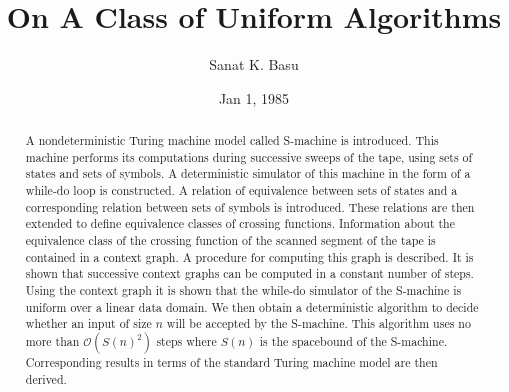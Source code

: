 \documentclass{article}
\title{On A Class of Uniform Algorithms}
\author{Sanat K. Basu}
\date{Jan 1, 1985}
\begin{document}
\newcommand\cell[1]{\mathrm{cell}\,#1}
\newcommand\cellp[1]{\mathrm{cell}'\,#1}
\newcommand\bigO[1]{$\mathcal{O}(#1)$}
\newcommand\Mcell[2]{$\,\substack{#1\\#2}\,$}
\newcommand\cancelb{\cancel{b}}
\newcommand\cancelc{\cancel{c}}
\newcommand{\suchthat}{\ni}
\newenvironment{aside}
{\begin{mdframed}[leftline=false, rightline=false, leftmargin=2em, rightmargin=2em,
    innerleftmargin=0pt, innerrightmargin=0pt, linewidth=0.75pt,skipabove=7pt, skipbelow=7pt]\small}
{\end{mdframed}}

\newenvironment{error}
{\begin{mdframed}[backgroundcolor=red!10, leftline=false, rightline=false, leftmargin=2em, rightmargin=2em,
    innerleftmargin=0pt, innerrightmargin=0pt, linewidth=0.75pt,skipabove=7pt, skipbelow=7pt]\small}
{\end{mdframed}}

\newtheorem{theorem}{Theorem}
\newtheorem{lemma}[theorem]{Lemma}

\maketitle
\begin{abstract}
A nondeterministic Turing machine model called S-machine is introduced.
This machine performs its computations during successive sweeps of the tape, using sets of states and sets of symbols.
A deterministic simulator of this machine in the form of a while-do loop is constructed.
A relation of equivalence between sets of states and a corresponding relation between sets of symbols is introduced.
These relations are then extended to define equivalence classes of crossing functions.
Information about the equivalence class of the crossing function of the scanned segment of the tape is contained
in a context graph.
A procedure for computing this graph is described.
It is shown that successive context graphs can be computed in a constant number of 
steps.
Using the context graph it is shown that the while-do simulator of the S-machine
is uniform over a linear data domain.
We then obtain a deterministic algorithm to
decide whether an input of size $n$ will be accepted by the S-machine.
This algorithm uses no more than \bigO{S(n)^2} steps where $S(n)$ is the spacebound
of the S-machine.
Corresponding results in terms of the standard Turing machine model are then derived.
\end{abstract}
\end{document}
